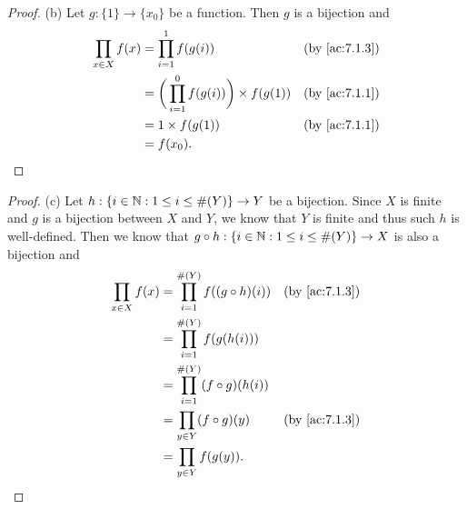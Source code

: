 \begin{proof}{(b)}
  Let \(g : \{1\} \to \{x_0\}\) be a function.
  Then \(g\) is a bijection and
  \begin{align*}
    \prod_{x \in X} f(x) & = \prod_{i = 1}^1 f(g(i))                            &  & \text{(by \cref{ac:7.1.3})} \\
                         & = \bigg(\prod_{i = 1}^0 f(g(i))\bigg) \times f(g(1)) &  & \text{(by \cref{ac:7.1.1})} \\
                         & = 1 \times f(g(1))                                   &  & \text{(by \cref{ac:7.1.1})} \\
                         & = f(x_0).
  \end{align*}
\end{proof}

\begin{proof}{(c)}
  Let \(h : \{i \in \mathbb{N} : 1 \leq i \leq \#(Y)\} \to Y\) be a bijection.
  Since \(X\) is finite and \(g\) is a bijection between \(X\) and \(Y\), we know that \(Y\) is finite and thus such \(h\) is well-defined.
  Then we know that \(g \circ h : \{i \in \mathbb{N} : 1 \leq i \leq \#(Y)\} \to X\) is also a bijection and
  \begin{align*}
    \prod_{x \in X} f(x) & = \prod_{i = 1}^{\#(Y)} f((g \circ h)(i)) &  & \text{(by \cref{ac:7.1.3})} \\
                         & = \prod_{i = 1}^{\#(Y)} f(g(h(i)))                                         \\
                         & = \prod_{i = 1}^{\#(Y)} (f \circ g)(h(i))                                  \\
                         & = \prod_{y \in Y} (f \circ g)(y)          &  & \text{(by \cref{ac:7.1.3})} \\
                         & = \prod_{y \in Y} f(g(y)).
  \end{align*}
\end{proof}

